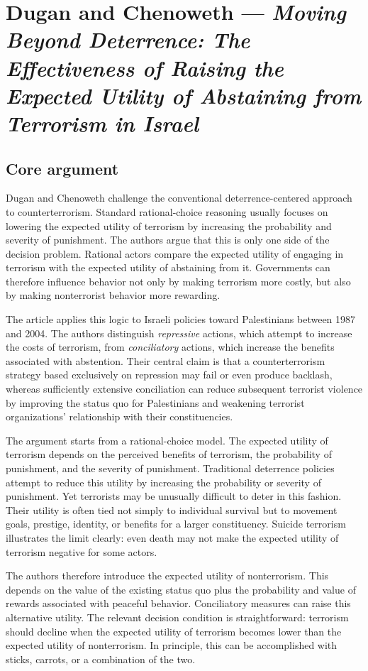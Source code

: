 \clearpage
\section{Dugan and Chenoweth --- \textit{Moving Beyond Deterrence: The Effectiveness of Raising the Expected Utility of Abstaining from Terrorism in Israel}}

\subsection{Core argument}

Dugan and Chenoweth challenge the conventional deterrence-centered approach to counterterrorism. Standard rational-choice reasoning usually focuses on lowering the expected utility of terrorism by increasing the probability and severity of punishment. The authors argue that this is only one side of the decision problem. Rational actors compare the expected utility of engaging in terrorism with the expected utility of abstaining from it. Governments can therefore influence behavior not only by making terrorism more costly, but also by making nonterrorist behavior more rewarding.

The article applies this logic to Israeli policies toward Palestinians between 1987 and 2004. The authors distinguish \textit{repressive} actions, which attempt to increase the costs of terrorism, from \textit{conciliatory} actions, which increase the benefits associated with abstention. Their central claim is that a counterterrorism strategy based exclusively on repression may fail or even produce backlash, whereas sufficiently extensive conciliation can reduce subsequent terrorist violence by improving the status quo for Palestinians and weakening terrorist organizations' relationship with their constituencies.

The argument starts from a rational-choice model. The expected utility of terrorism depends on the perceived benefits of terrorism, the probability of punishment, and the severity of punishment. Traditional deterrence policies attempt to reduce this utility by increasing the probability or severity of punishment. Yet terrorists may be unusually difficult to deter in this fashion. Their utility is often tied not simply to individual survival but to movement goals, prestige, identity, or benefits for a larger constituency. Suicide terrorism illustrates the limit clearly: even death may not make the expected utility of terrorism negative for some actors.

The authors therefore introduce the expected utility of nonterrorism. This depends on the value of the existing status quo plus the probability and value of rewards associated with peaceful behavior. Conciliatory measures can raise this alternative utility. The relevant decision condition is straightforward: terrorism should decline when the expected utility of terrorism becomes lower than the expected utility of nonterrorism. In principle, this can be accomplished with sticks, carrots, or a combination of the two.

